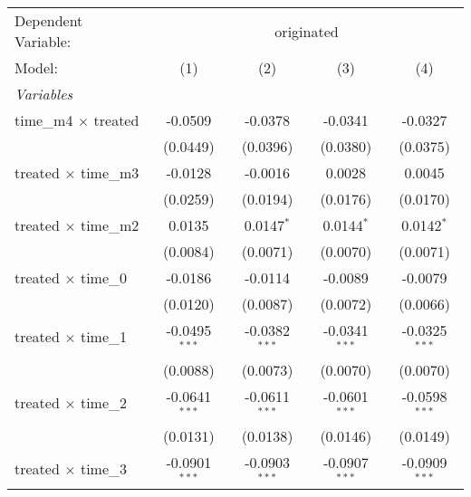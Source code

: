 \begingroup
\centering
\begin{tabular}{lcccc}
   \tabularnewline \midrule \midrule
   Dependent Variable: & \multicolumn{4}{c}{originated}\\
   Model:                                              & (1)             & (2)             & (3)             & (4)\\  
   \midrule
   \emph{Variables}\\
   time\_m4 $\times$ treated                           & -0.0509         & -0.0378         & -0.0341         & -0.0327\\   
                                                       & (0.0449)        & (0.0396)        & (0.0380)        & (0.0375)\\   
   treated $\times$ time\_m3                           & -0.0128         & -0.0016         & 0.0028          & 0.0045\\   
                                                       & (0.0259)        & (0.0194)        & (0.0176)        & (0.0170)\\   
   treated $\times$ time\_m2                           & 0.0135          & 0.0147$^{*}$    & 0.0144$^{*}$    & 0.0142$^{*}$\\   
                                                       & (0.0084)        & (0.0071)        & (0.0070)        & (0.0071)\\   
   treated $\times$ time\_0                            & -0.0186         & -0.0114         & -0.0089         & -0.0079\\   
                                                       & (0.0120)        & (0.0087)        & (0.0072)        & (0.0066)\\   
   treated $\times$ time\_1                            & -0.0495$^{***}$ & -0.0382$^{***}$ & -0.0341$^{***}$ & -0.0325$^{***}$\\   
                                                       & (0.0088)        & (0.0073)        & (0.0070)        & (0.0070)\\   
   treated $\times$ time\_2                            & -0.0641$^{***}$ & -0.0611$^{***}$ & -0.0601$^{***}$ & -0.0598$^{***}$\\   
                                                       & (0.0131)        & (0.0138)        & (0.0146)        & (0.0149)\\   
   treated $\times$ time\_3                            & -0.0901$^{***}$ & -0.0903$^{***}$ & -0.0907$^{***}$ & -0.0909$^{***}$\\   

\end{tabular}
